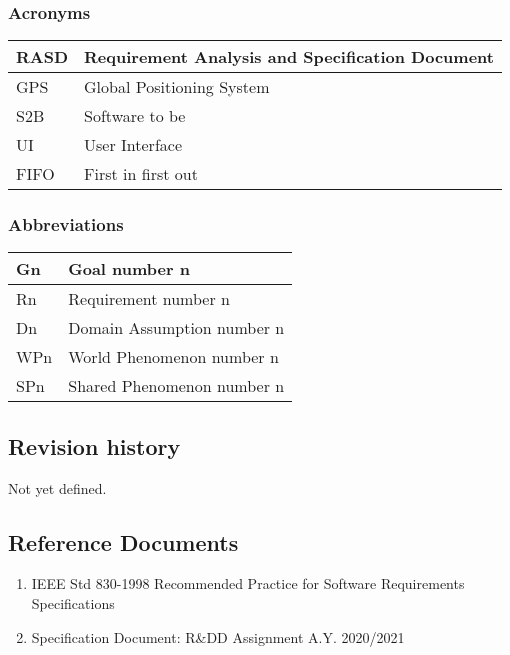 \subsubsection{Acronyms}
\begin{tabular}{ | m{5cm} | m{10cm} | }
	\hline
	RASD & Requirement Analysis and Specification Document \\
	\hline
	GPS & Global Positioning System \\
	\hline
	S2B & Software to be \\
	\hline
	UI & User Interface\\
	\hline
	FIFO & First in first out\\
	\hline
\end{tabular}
\subsubsection{Abbreviations}
\begin{tabular}{ | m{5cm} | m{10cm} | }
	\hline
	Gn & Goal number n \\
	\hline
	Rn & Requirement number n \\
	\hline
	Dn & Domain Assumption number n \\
	\hline
	WPn & World Phenomenon number n \\
	\hline
	SPn & Shared Phenomenon number n \\
	\hline
\end{tabular}
\subsection{Revision history}
Not yet defined.
\subsection{Reference Documents}
\begin{enumerate}
	\item IEEE Std 830-1998 Recommended Practice for Software Requirements Specifications
	\item Specification Document: R\&DD Assignment A.Y. 2020/2021
\end{enumerate}
